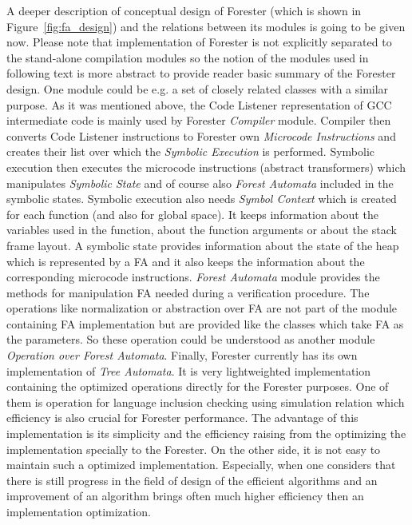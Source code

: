 A deeper description of conceptual design of Forester (which is shown in Figure~\ref{fig:fa_design})
and the relations between its modules is going to be given now.
Please note that implementation of Forester is not explicitly separated to the stand-alone compilation modules so the notion of the modules
used in following text is more abstract to provide reader basic summary of the Forester design.
One module could be e.g. a set of closely related classes with a similar purpose.
As it was mentioned above, the Code Listener representation of GCC intermediate code is mainly used by Forester \emph{Compiler} module.
Compiler then converts Code Listener instructions to Forester own \emph{Microcode Instructions}
and creates their list over which the \emph{Symbolic Execution} is performed.
Symbolic execution then executes the microcode instructions (abstract transformers)
which manipulates \emph{Symbolic State} and of course
also \emph{Forest Automata} included in the symbolic states.
Symbolic execution also needs \emph{Symbol Context} which is created for each function (and also for global space).
It keeps information about the variables used in the function,
about the function arguments or about the stack frame layout.
A symbolic state provides information about the state of the heap which is represented
by a FA and it also keeps the information about
the corresponding microcode instructions.
\emph{Forest Automata} module provides the methods for manipulation FA needed during a verification procedure.
The operations like normalization or abstraction over FA are not part of the module containing FA implementation but are provided
like the classes which take FA as the parameters.
So these operation could be understood as another module \emph{Operation over Forest Automata}.
Finally, Forester currently has its own implementation of \emph{Tree Automata}.
It is very lightweighted implementation containing the optimized
operations directly for the Forester purposes.
One of them is operation for language inclusion checking using simulation relation
which efficiency is also crucial for Forester performance.
The advantage of this implementation is its simplicity and
the efficiency raising from the optimizing the implementation specially to the Forester.
On the other side, it is not easy to maintain such a optimized implementation.
Especially, when one considers that there is still progress in the field of design of the efficient algorithms
and an improvement of an algorithm brings often much higher efficiency then an implementation optimization.

